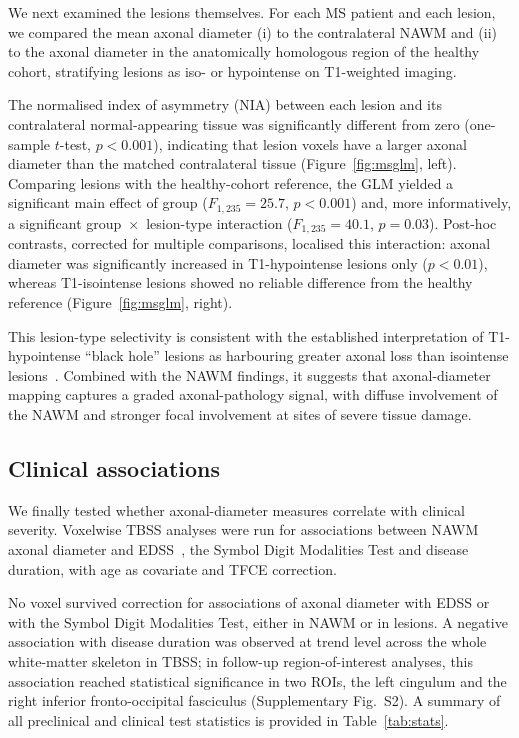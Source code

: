 \documentclass[11pt]{article}
\begin{document}
We next examined the lesions themselves. For each MS patient and each lesion, we compared the mean axonal diameter (i) to the contralateral NAWM and (ii) to the axonal diameter in the anatomically homologous region of the healthy cohort, stratifying lesions as iso- or hypointense on T1-weighted imaging.

The normalised index of asymmetry (NIA) between each lesion and its contralateral normal-appearing tissue was significantly different from zero (one-sample $t$-test, $p<0.001$), indicating that lesion voxels have a larger axonal diameter than the matched contralateral tissue (Figure~\ref{fig:msglm}, left). Comparing lesions with the healthy-cohort reference, the GLM yielded a significant main effect of group ($F_{1,235}=25.7$, $p<0.001$) and, more informatively, a significant group~$\times$~lesion-type interaction ($F_{1,235}=40.1$, $p=0.03$). Post-hoc contrasts, corrected for multiple comparisons, localised this interaction: axonal diameter was significantly increased in T1-hypointense lesions only ($p<0.01$), whereas T1-isointense lesions showed no reliable difference from the healthy reference (Figure~\ref{fig:msglm}, right).

This lesion-type selectivity is consistent with the established interpretation of T1-hypointense ``black hole'' lesions as harbouring greater axonal loss than isointense lesions~\cite{vanwaesberghe1999axonal,raz2015relationship}. Combined with the NAWM findings, it suggests that axonal-diameter mapping captures a graded axonal-pathology signal, with diffuse involvement of the NAWM and stronger focal involvement at sites of severe tissue damage.

\subsection{Clinical associations}

We finally tested whether axonal-diameter measures correlate with clinical severity. Voxelwise TBSS analyses were run for associations between NAWM axonal diameter and EDSS~\cite{kurtzke1983rating}, the Symbol Digit Modalities Test and disease duration, with age as covariate and TFCE correction.

No voxel survived correction for associations of axonal diameter with EDSS or with the Symbol Digit Modalities Test, either in NAWM or in lesions. A negative association with disease duration was observed at trend level across the whole white-matter skeleton in TBSS; in follow-up region-of-interest analyses, this association reached statistical significance in two ROIs, the left cingulum and the right inferior fronto-occipital fasciculus (Supplementary Fig.~S2). A summary of all preclinical and clinical test statistics is provided in Table~\ref{tab:stats}.
\end{document}
